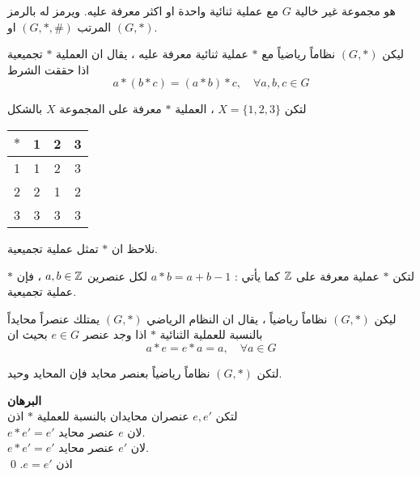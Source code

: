 \begin{definition}
	هو مجموعة غير خالية $G$ مع عملية ثنائية واحدة او اكثر معرفة عليه. ويرمز له بالرمز المرتب $(G, *, \#)$ او $(G, *)$.
\end{definition}

\begin{definition}
	ليكن $(G, *)$ نظاماً رياضياً مع $*$ عملية ثنائية معرفة عليه ، يقال ان العملية $*$ تجميعية اذا حققت الشرط
	\[
	a*(b*c) = (a*b)*c,\quad \forall a,b,c\in G
	\]
\end{definition}

\begin{example}
	لتكن $X = \{1,2,3\}$ ، العملية $*$ معرفة على المجموعة $X$ بالشكل
	\begin{table}[H]
		\renewcommand{\arraystretch}{1.4}
		\centering
		\setLR
		\begin{tabular}{|c|c|c|c|}
			\hline
			$*$ & 1&2&3\\
			\hline
			1&1&2&3\\
			\hline
			2&2&1&2\\
			\hline
			3&3&3&3\\
			\hline
		\end{tabular}
	\end{table}
	\setRL\noindent
	نلاحظ ان $*$ تمثل عملية تجميعية.
\end{example}

\begin{example}
	لتكن $*$ عملية معرفة على $\mathbb{Z}$ كما يأتي : $a*b =a+b-1$ لكل عنصرين $a, b\in \mathbb{Z}$ ، فإن $*$ عملية تجميعية.
\end{example}

\begin{definition}
	ليكن $(G, *)$ نظاماً رياضياً ، يقال ان النظام الرياضي $(G, *)$ يمتلك عنصراً محايداً بالنسبة للعملية الثنائية $*$ اذا وجد عنصر $e \in G$ بحيث ان
	\[
	a * e = e*a = a,\quad \forall a\in G
	\]
\end{definition}

\begin{theorem}
	لتكن $(G, *)$ نظاماً رياضياً بعنصر محايد فإن المحايد وحيد.
\end{theorem}
\noindent
\textbf{البرهان}\\
\noindent
لتكن $e, e'$ عنصران محايدان بالنسبة للعملية $*$ اذن\\
$e*e' =e'$ لان $e$ عنصر محايد.\\
$e*e' =e'$ لان $e'$ عنصر محايد.\\
اذن $e=e'$. \qed

